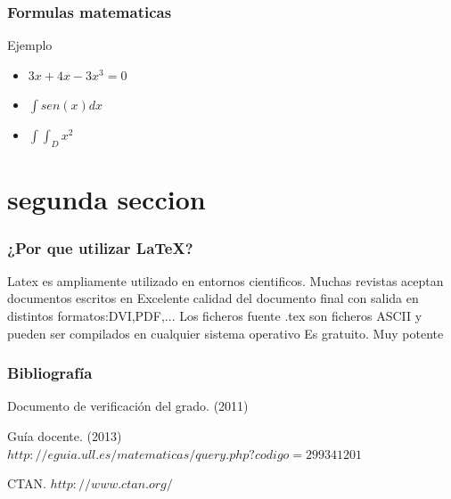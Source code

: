 \documentclass{beamer}
\begin{document}
\begin{frame}

\frametitle{Formulas matematicas}

\begin{block}{Ejemplo}
  \begin{itemize}
  \item
  $3x+4x-3x^3=0$ 
  \pause

  \item
  $\int sen(x) dx$
  \pause

  \item
  $\int\int_D x^2$

  \end{itemize}
\end{block}

\end{frame}

\section{segunda seccion}
\begin{frame}
\begin{itemize}
\frametitle{¿Por que utilizar \LaTeX{}?}
Latex es ampliamente utilizado en entornos cientificos. Muchas revistas aceptan documentos escritos en \Latex
Excelente calidad del documento final con salida en distintos formatos:DVI,PDF,...
Los ficheros fuente .tex son ficheros ASCII y pueden ser compilados en cualquier sistema operativo
Es gratuito.
Muy potente
\end{itemize}
\end{frame} 

\begin{frame}
  \frametitle{Bibliografía}

  \begin{thebibliography}{10}

    \beamertemplatebookbibitems
    Documento de verificación del grado. 
    (2011) 

    \beamertemplatebookbibitems
    Guía docente. 
    (2013) 
    {\small $http://eguia.ull.es/matematicas/query.php?codigo=299341201$}

    \beamertemplatebookbibitems
    CTAN. {\small $http://www.ctan.org/$}

  \end{thebibliography}
  
\end{frame}
\end{document}
